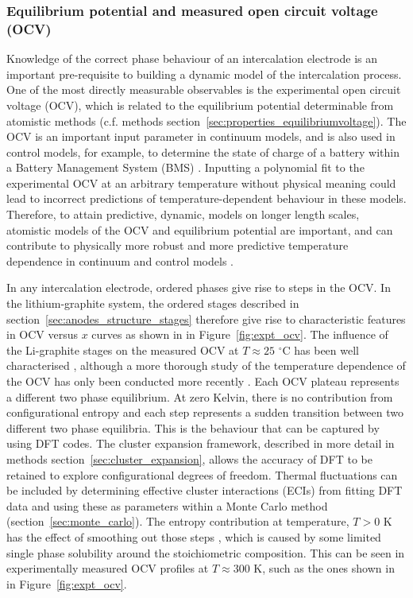 \documentclass[../main.tex]{subfiles}
\begin{document}
\subsubsection{Equilibrium potential and measured open circuit voltage (OCV)}
\label{sec:anodes_ocv}

Knowledge of the correct phase behaviour of an intercalation electrode is an important pre-requisite to building a dynamic model of the intercalation process. One of the most directly measurable observables is the experimental open circuit voltage (OCV), which is related to the equilibrium potential determinable from atomistic methods (c.f. methods section~\ref{sec:properties_equilibriumvoltage}). The OCV is an important input parameter in continuum models, and is also used in control models, for example, to determine the state of charge of a battery within a Battery Management System (BMS) \cite{PLETT2004262}. Inputting a polynomial fit to the experimental OCV at an arbitrary temperature without physical meaning could lead to incorrect predictions of temperature-dependent behaviour in these models. Therefore, to attain predictive, dynamic, models on longer length scales, atomistic models of the OCV and equilibrium potential are important, and can contribute to physically more robust and more predictive temperature dependence in continuum and control models \cite{VanderVen2020,Urban2016}.

In any intercalation electrode, ordered phases give rise to steps in the OCV. In the lithium-graphite system, the ordered stages described in section~\ref{sec:anodes_structure_stages} therefore give rise to characteristic features in OCV versus $x$ curves \cite{Dahn1991,Ohzuku1993} as shown in in Figure~\ref{fig:expt_ocv}.  The influence of the Li-graphite stages on the measured OCV at $T \approx 25$ $^{\circ}$C has been well characterised \cite{Sole2014,Zheng1995,Senyshyn2013,Taminato2016,Allart2018,Sethuraman2010,Markevich2005,Dahn1991,Ohzuku1993}, although a more thorough study of the temperature dependence of the OCV has only been conducted more recently \cite{Mercer2021}. Each OCV plateau represents a different two phase equilibrium. At zero Kelvin, there is no contribution from configurational entropy and each step represents a sudden transition between two different two phase equilibria. This is the behaviour that can be captured by using DFT codes. The cluster expansion framework, described in more detail in methods section~\ref{sec:cluster_expansion}, allows the accuracy of DFT to be retained to explore configurational degrees of freedom. Thermal fluctuations can be included by determining effective cluster interactions (ECIs) from fitting DFT data and using these as parameters within a Monte Carlo method (section~\ref{sec:monte_carlo}). The entropy contribution at temperature, $T> 0$ K has the effect of smoothing out those steps \cite{Mercer2019,OTERO2017569,REYNIER2003850,Mercer2021}, which is caused by some limited single phase solubility around the stoichiometric composition. This can be seen in experimentally measured OCV profiles at $T \approx 300$ K, such as the ones shown in in Figure~\ref{fig:expt_ocv}.  
\end{document}

